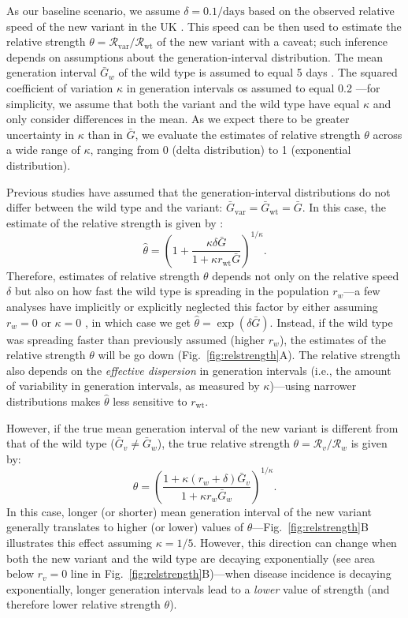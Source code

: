 \documentclass[12pt]{article}
\newcommand{\fref}[1]{Fig.~\ref{fig:#1}}
\newcommand{\rx}[1]{\ensuremath{{r}_{#1}}\xspace}
\newcommand{\ry}[1]{\rx{\mathrm{#1}}}
\newcommand{\Rx}[1]{\ensuremath{{\mathcal R}_{#1}}\xspace}
\newcommand{\Ry}[1]{\Rx{\mathrm{#1}}}
\newcommand{\RR}{\ensuremath{{\mathcal R}}\xspace}
\newcommand{\Gx}[1]{\ensuremath{{\bar G}_{#1}}\xspace}
\newcommand{\Gy}[1]{\Gx{\mathrm{#1}}}
\begin{document}
As our baseline scenario, we assume $\delta = 0.1/\textrm{days}$ based on the observed relative speed of the new variant in the UK \citep{davies2021estimated}.
This speed can be then used to estimate the relative strength $\theta = \Ry{var}/\Ry{wt}$ of the new variant with a caveat; such inference depends on assumptions about the generation-interval distribution.
The mean generation interval $\bar{G}_w$ of the wild type is assumed to equal 5 days \citep{ferretti2020quantifying}.
The squared coefficient of variation $\kappa$ in generation intervals os assumed to equal 0.2 \citep{ferretti2020quantifying}---for simplicity, we assume that both the variant and the wild type have equal $\kappa$ and only consider differences in the mean.
As we expect there to be greater uncertainty in $\kappa$ than in $\bar{G}$, we evaluate the estimates of relative strength $\theta$ across a wide range of $\kappa$, ranging from 0 (delta distribution) to 1 (exponential distribution).

Previous studies have assumed that the generation-interval distributions do not differ between the wild type and the variant: $\Gy{var} = \Gy{wt} = \bar{G}$.
In this case, the estimate of the relative strength is given by \citep{park2019practical}:
\begin{equation}
\hat{\theta} = \left(1 + \frac{\kappa \delta \bar{G}}{1 + \kappa \ry{wt} \bar{G}}\right)^{1/\kappa}.
\end{equation}
Therefore, estimates of relative strength $\theta$ depends not only on the relative speed $\delta$ but also on how fast the wild type is spreading in the population $r_w$---a few analyses have implicitly or explicitly neglected this factor by either assuming $r_w = 0$ \citep{switzerland2021variant} or $\kappa = 0$ \citep{davies2021estimated}, in which case we get $\hat{\theta} = \exp(\delta \bar{G})$.
Instead, if the wild type was spreading faster than previously assumed (higher $r_w$), the estimates of the relative strength $\theta$ will be go down (\fref{relstrength}A).
The relative strength also depends on the \emph{effective dispersion} in generation intervals (i.e., the amount of variability in generation intervals, as measured by $\kappa$)---using narrower distributions makes $\hat{\theta}$ less sensitive to $\ry{wt}$.

However, if the true mean generation interval of the new variant is different from that of the wild type ($\bar{G}_v \neq \bar{G}_w$), the true relative strength $\theta = \RR_v/\RR_w$ is given by:
\begin{equation}
\theta = \left(\frac{1 + \kappa (r_w + \delta) \bar{G}_v}{1 + \kappa r_w \bar{G}_w}\right)^{1/\kappa}.
\end{equation}
In this case, longer (or shorter) mean generation interval of the new variant generally translates to higher (or lower) values of $\theta$---\fref{relstrength}B illustrates this effect assuming $\kappa = 1/5$.
However, this direction can change when both the new variant and the wild type are decaying exponentially (see area below $r_v = 0$ line in \fref{relstrength}B)---when disease incidence is decaying exponentially, longer generation intervals lead to a \emph{lower} value of strength (and therefore lower relative strength $\theta$).
\end{document}
